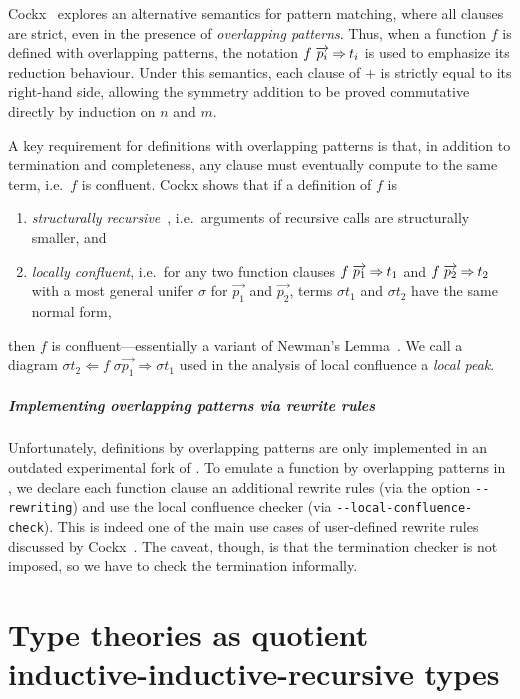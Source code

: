 \documentclass[a4paper,UKenglish,numberwithinsect,cleveref,thm-restate]{lipics-v2021}
\begin{document}
Cockx~\cite{Cockx2014} explores an alternative semantics for pattern matching, where all clauses are strict, even in the presence of \emph{overlapping patterns}.
Thus, when a function $f$ is defined with overlapping patterns, the notation $f\;\overrightarrow{p_i} \mathbin{\Rightarrow} t_i$ is used to emphasize its reduction behaviour.
Under this semantics, each clause of $+$ is strictly equal to its right-hand side, allowing the symmetry addition to be proved commutative directly by induction on $n$ and $m$.

A key requirement for definitions with overlapping patterns is that, in addition to termination and completeness, any clause must eventually compute to the same term, i.e.\ $f$ is confluent.
Cockx shows that if a definition of $f$ is
\begin{enumerate}
  \item \emph{structurally recursive}~\cite{Abel2002}, i.e.\ arguments of recursive calls are structurally smaller, and
  \item \emph{locally confluent}, i.e.\ for any two function clauses $f\;\overrightarrow{p_1} \mathbin{\Rightarrow} t_1$ and $f\;\overrightarrow{p_2} \mathbin{\Rightarrow} t_2$ with a most general unifer $\sigma$ for $\overrightarrow{p_1}$ and $\overrightarrow{p_2}$, terms $\sigma t_1$ and $\sigma t_2$ have the same normal form, 
\end{enumerate}
then $f$ is confluent---essentially a variant of Newman's Lemma~\cite{Newman1942}.
We call a diagram $\sigma t_2 \Leftarrow f\;\sigma\overrightarrow{p_1} \Rightarrow \sigma t_1$ used in the analysis of local confluence a \emph{local peak}.

\subparagraph*{Implementing overlapping patterns via rewrite rules}
Unfortunately, definitions by overlapping patterns are only implemented in an outdated experimental fork of \Agda.
To emulate a function by overlapping patterns in \Agda, we declare each function clause an additional rewrite rules \cite{Cockx2020,Cockx2021} (via the option \texttt{-{}-rewriting}) and use the local confluence checker (via \texttt{-{}-local-confluence-check}).
This is indeed one of the main use cases of user-defined rewrite rules discussed by Cockx~\cite{Cockx2020}. 
The caveat, though, is that the termination checker is not imposed, so we have to check the termination informally.

\section{Type theories as quotient inductive-inductive-recursive types} \label{sec:QIIRTs}
\end{document}
